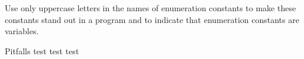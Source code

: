 
\begin{frame}[fragile]{}
  \begin{center}
    \begin{minipage}{0.7\textwidth}
	  \inputminted[bgcolor=black, linenos]{c}{code/hello.c}
    \end{minipage}
  \end{center}
\end{frame}

\begin{frame}{}
  \begin{error}
    Use only uppercase letters in the names of enumeration constants to make these
    constants stand out in a program and to indicate that enumeration constants
    are variables.
  \end{error}

  \renewcommand\bcStyleTitre[1]{\centering\tikz\node[starburst, draw]{\large\textsc{\red{#1}}};}
  \begin{bclogo}[
    couleur = red!20,
    arrondi=0,
    logo=\bcbombe,
    ]{Pitfalls}
    test test test
  \end{bclogo}
\end{frame}
